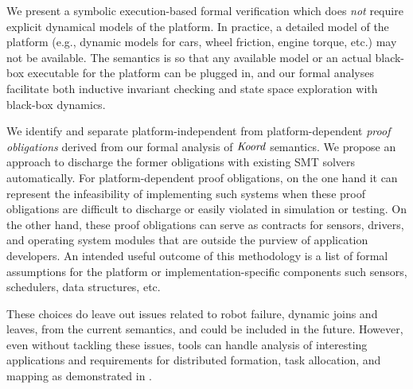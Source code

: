 \begin{noinditem}
\item We present a \K symbolic execution-based formal verification  which does {\em not} require explicit dynamical models of the platform.
In practice, a detailed model of the platform (e.g., dynamic models for cars, wheel friction, engine torque, etc.) may not be available.
The \lgname semantics is  so that any available model or an actual black-box executable for the platform can be plugged in,
and our formal analyses facilitate both inductive invariant checking and state space exploration with black-box dynamics.

\item We identify and separate platform-independent from platform-dependent \emph{proof obligations} derived from our formal analysis of $\emph{Koord}$ semantics. We  propose an approach to discharge the former obligations with existing SMT solvers automatically. For platform-dependent proof obligations,
on the one hand it can represent the infeasibility of implementing such systems
when these proof obligations are difficult to discharge or easily violated in simulation or testing.
On the other hand, these proof obligations can serve as contracts for sensors, drivers, and operating system modules that are outside the purview  of application developers.
An intended useful outcome of this methodology is a list of formal assumptions for the platform or implementation-specific components such sensors, schedulers, data structures, etc.
\end{noinditem}
%
These choices do leave out issues related to robot failure, dynamic joins and leaves, from the current semantics, and could be included in the future.
However, even without tackling these issues, \lgname tools can handle analysis of interesting applications and requirements
for distributed formation, task allocation, and mapping as demonstrated in .


